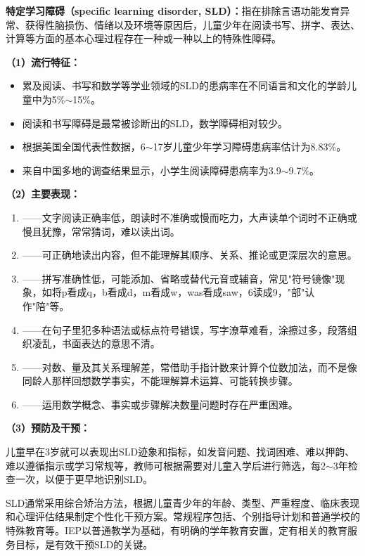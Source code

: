 \begin{keybox}
\textbf{特定学习障碍（specific learning disorder, SLD）：}指在排除言语功能发育异常、获得性脑损伤、情绪以及环境等原因后，儿童少年在阅读书写、拼字、表达、计算等方面的基本心理过程存在一种或一种以上的特殊性障碍。

\vspace{4pt}
\textbf{（1）流行特征：}

\begin{itemize}[leftmargin=*]
    \item 累及阅读、书写和数学等学业领域的SLD的患病率在不同语言和文化的学龄儿童中为5\%$\sim$15\%。
    \item 阅读和书写障碍是最常被诊断出的SLD，数学障碍相对较少。
    \item 根据美国全国代表性数据，6$\sim$17岁儿童少年学习障碍患病率估计为8.83\%。
    \item 来自中国多地的调查结果显示，小学生阅读障碍患病率为3.9$\sim$9.7\%。
\end{itemize}

\vspace{4pt}
\textbf{（2）主要表现：}

\begin{enumerate}[leftmargin=*]
    \item {}——文字阅读正确率低，朗读时不准确或慢而吃力，大声读单个词时不正确或慢且犹豫，常常猜词，难以读出词。
    \item {}——可正确地读出内容，但不能理解其顺序、关系、推论或更深层次的意思。
    \item {}——拼写准确性低，可能添加、省略或替代元音或辅音，常见"符号镜像"现象，如将p看成q，b看成d，m看成w，was看成saw，6读成9，"部"认作"陪"等。
    \item {}——在句子里犯多种语法或标点符号错误，写字潦草难看，涂擦过多，段落组织凌乱，书面表达的意思不清。
    \item {}——对数、量及其关系理解差，常借助手指计数来计算个位数加法，而不是像同龄人那样回想数学事实，不能理解算术运算、可能转换步骤。
    \item {}——运用数学概念、事实或步骤解决数量问题时存在严重困难。
\end{enumerate}

\vspace{4pt}
\textbf{（3）预防及干预：}

儿童早在3岁就可以表现出SLD迹象和指标，如发音问题、找词困难、难以押韵、难以遵循指示或学习常规等，教师可根据需要对儿童入学后进行筛选，每2$\sim$3年检查一次，以便于更早地识别SLD。

SLD通常采用综合矫治方法，根据儿童青少年的年龄、类型、严重程度、临床表现和心理评估结果制定个性化干预方案。常规程序包括、个别指导计划和普通学校的特殊教育等。IEP以普通教学为基础，有明确的学年教育安置，定有相关的教育服务目标，是有效干预SLD的关键。
\end{keybox}

